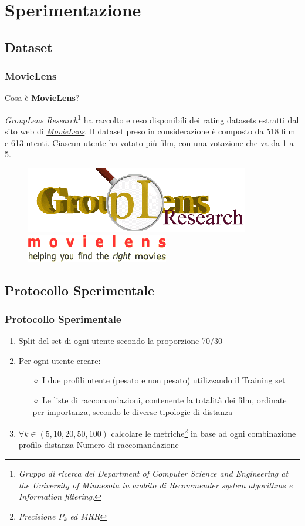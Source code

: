 \documentclass{beamer}
\begin{document}
\section{Sperimentazione}
\subsection{Dataset}
\begin{frame}
\frametitle{MovieLens}
Cosa è \textbf{MovieLens}? \\ \vspace{0.5cm}

\href{http://www.grouplens.org/}{\emph{GroupLens Research}}\footnote{\tiny \emph{Gruppo di ricerca del Department of Computer Science and Engineering at the University of Minnesota in ambito di Recommender system algorithms e Information filtering}.} ha raccolto e reso disponibili dei rating datasets estratti dal sito web di \href{http://movielens.umn.edu}{\emph{MovieLens}}.
Il dataset preso in considerazione è composto da 518 film e 613 utenti. Ciascun utente ha votato più film, con una votazione che va da 1 a 5. 
\begin{figure}
	\includegraphics[width=.3\textwidth]{figure/gl-logo} ~~~~ 
	\includegraphics[width=.3\textwidth]{figure/movielens-helping}
\end{figure}
\end{frame}

\subsection{Protocollo Sperimentale}


\begin{frame}
\frametitle{Protocollo Sperimentale}
\begin{enumerate}
	\setlength{\itemsep}{10pt}
	\item<1-> Split del set di ogni utente secondo la proporzione 70/30
	\item<2-> Per ogni utente creare:
	\begin{itemize}
		\setlength{\itemsep}{6pt}
		\item[$\diamond$] I due profili utente (pesato e non pesato) utilizzando il Training set
		\item[$\diamond$] Le liste di raccomandazioni, contenente la totalità dei film, ordinate per importanza, secondo le diverse tipologie di distanza
	\end{itemize}
	\item<3-> $\forall k \in (5,10,20,50,100)$ calcolare le metriche\footnote{\emph{Precisione $P_k$ ed MRR}} in base ad ogni combinazione profilo-distanza-Numero di raccomandazione
\end{enumerate}
\end{frame}
\end{document}
